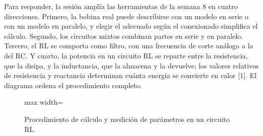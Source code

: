 \documentclass[11pt,letterpaper]{article}
\begin{document}
Para responder, la sesión amplía las herramientas de la semana 8 en cuatro direcciones. Primero, la bobina real puede describirse con un modelo en serie o con un modelo en paralelo, y elegir el adecuado según el conexionado simplifica el cálculo. Segundo, los circuitos mixtos combinan partes en serie y en paralelo. Tercero, el RL se comporta como filtro, con una frecuencia de corte análoga a la del RC. Y cuarto, la potencia en un circuito RL se reparte entre la resistencia, que la disipa, y la inductancia, que la almacena y la devuelve; los valores relativos de resistencia y reactancia determinan cuánta energía se convierte en calor [1]. El diagrama ordena el procedimiento completo.

\begin{figure}[H]
  \centering
  \begin{adjustbox}{max width=\linewidth}
  \end{adjustbox}
  \caption{Procedimiento de cálculo y medición de parámetros en un circuito RL}
\end{figure}
\end{document}
